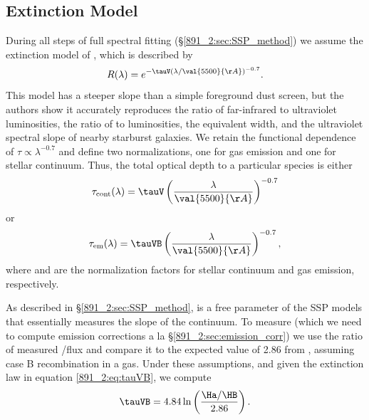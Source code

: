 
\subsection{Extinction Model}
\label{891_2:sec:extinction}

During all steps of full spectral fitting
(\S\ref{891_2:sec:SSP_method}) we assume the extinction model of
\citet{Charlot00}, which is described by
\begin{equation}
R(\lambda) = e^{-\tauV \left(\lambda/\val{5500}{\AA}\right)^{-0.7}}.
\end{equation}
This model has a steeper slope than a simple foreground dust screen,
but the authors show it accurately reproduces the ratio of
far-infrared to ultraviolet luminosities, the ratio of \Ha to \HB
luminosities, the \Ha equivalent width, and the ultraviolet spectral
slope of nearby starburst galaxies. We retain the functional
dependence of $\tau \propto \lambda^{-0.7}$ and define two
normalizations, one for gas emission and one for stellar
continuum. Thus, the total optical depth to a particular species is
either
\begin{equation}
\tau_{{\rm cont}}(\lambda) = \tauV \left(\frac{\lambda}{\val{5500}{\AA}}\right)^{-0.7}
\end{equation}
or
\begin{equation}
\label{891_2:eq:tauVB}
\tau_{{\rm em}}(\lambda) = \tauVB \left(\frac{\lambda}{\val{5500}{\AA}}\right)^{-0.7},
\end{equation}
where \tauV and \tauVB are the normalization factors for stellar continuum and
gas emission, respectively.

As described in \S\ref{891_2:sec:SSP_method}, \tauV is a free
parameter of the SSP models that essentially measures the slope of the
continuum. To measure \tauVB (which we need to compute emission
corrections a la \S\ref{891_2:sec:emission_corr}) we use the ratio of
measured \Ha/\HB flux and compare it to the expected value of 2.86
from \citet{Osterbrock89}, assuming case B recombination in a
 gas. Under these assumptions, and given the extinction
law in equation \ref{891_2:eq:tauVB}, we compute
\begin{equation}
\label{891_2:eq:Balmer_extinction}
\tauVB = 4.84 \ln \left(\frac{\Ha/\HB}{2.86}\right).
\end{equation}

